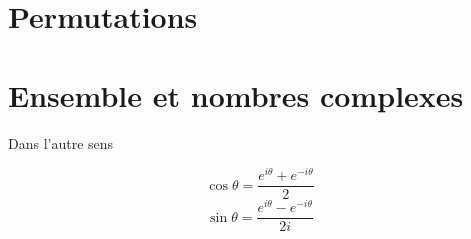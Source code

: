 \documentclass[a4paper, 12pt]{article}
\begin{document}


\section{Permutations}


\section{Ensemble et nombres complexes}











Dans l'autre sens

$$
\cos \theta = \dfrac{e^{i\theta} + e^{-i \theta}}{2}
$$
$$
\sin \theta = \dfrac{e^{i\theta} - e^{-i \theta}}{2i}
$$


\end{document}
